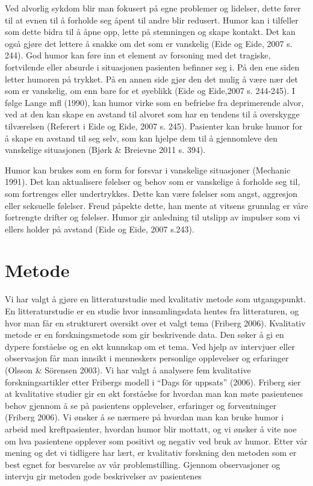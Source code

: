 Ved alvorlig sykdom blir man fokusert på egne problemer og lidelser, dette
fører til at evnen til å forholde seg åpent til andre blir redusert. Humor kan
i tilfeller som dette bidra til å åpne opp, lette på stemningen og skape
kontakt. Det kan også gjøre det lettere å snakke om det som er vanskelig (Eide
og Eide, 2007 s. 244). God humor kan føre inn et element av forsoning med det
tragiske, fortvilende eller absurde i situasjonen pasienten befinner seg i. På
den ene siden letter humoren på trykket. På en annen side gjør den det mulig å
være nær det som er vanskelig, om enn bare for et øyeblikk (Eide og Eide,2007
s. 244-245). I følge Lange mfl (1990), kan humor virke som en befrielse fra
deprimerende alvor, ved at den kan skape en avstand til alvoret som har en
tendens til å overskygge tilværelsen (Referert i Eide og Eide, 2007 s. 245).
Pasienter kan bruke humor for å skape en avstand til seg selv, som kan hjelpe
dem til å gjennomleve den vanskelige situasjonen (Bjørk \&{} Breievne 2011 s.
394).

Humor kan brukes som en form for forsvar i vanskelige situasjoner (Mechanic
1991). Det kan aktualisere følelser og behov som er vanskelige å forholde seg
til, som fortrenges eller undertrykkes. Dette kan være følelser som angst,
aggresjon eller seksuelle følelser. Freud påpekte dette, han mente at vitsens
grunnlag er våre fortrengte drifter og følelser. Humor gir anledning til
utslipp av impulser som vi ellers holder på avstand (Eide og Eide, 2007 s.243).

\chapter{Metode}

Vi har valgt å gjøre en litteraturstudie med kvalitativ metode som
utgangspunkt. En litteraturstudie er en studie hvor innsamlingsdata hentes fra
litteraturen, og hvor man får en strukturert oversikt over et valgt tema
(Friberg 2006). Kvalitativ metode er en forskningsmetode som gir beskrivende
data. Den søker å gi en dypere forståelse og en økt kunnskap om et tema. Ved
hjelp av intervjuer eller observasjon får man innsikt i menneskers personlige
opplevelser og erfaringer (Olsson \&{} Sörensen 2003). Vi har valgt å analysere
fem kvalitative forskningsartikler etter Fribergs modell i “Dags för uppsats”
(2006). Friberg sier at kvalitative studier gir en økt forståelse for hvordan
man kan møte pasientenes behov gjennom å se på pasientens opplevelser,
erfaringer og forventninger (Friberg 2006).  Vi ønsker å se nærmere på hvordan
man kan bruke humor i arbeid med kreftpasienter, hvordan humor blir mottatt, og
vi ønsker å vite noe om hva pasientene opplever som positivt og negativ ved
bruk av humor. Etter vår mening og det vi tidligere har lært, er kvalitativ
forskning den metoden som er best egnet for besvarelse av vår problemstilling.
Gjennom observasjoner og intervju gir metoden gode beskrivelser av pasientenes

